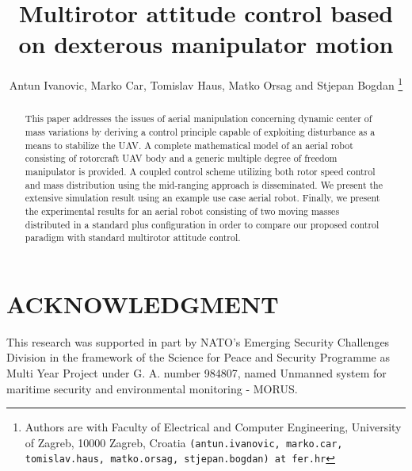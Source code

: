 \documentclass[letterpaper, 10 pt, conference]{ieeeconf}  %
\title{\LARGE \bf
Multirotor attitude control based on dexterous manipulator motion
}
\author{Antun Ivanovic, Marko Car, Tomislav Haus, Matko Orsag and Stjepan Bogdan
	\thanks{Authors are with Faculty of Electrical and Computer Engineering,
        University of Zagreb, 10000 Zagreb, Croatia
        {\tt\small (antun.ivanovic, marko.car, tomislav.haus, matko.orsag, stjepan.bogdan) at fer.hr}}}%
\begin{document}
\maketitle

\thispagestyle{empty}
\pagestyle{empty}


\begin{abstract}

This paper addresses the issues of aerial manipulation concerning dynamic center of mass variations by deriving a control principle capable of exploiting disturbance as a means to stabilize the UAV. A complete mathematical model of an aerial robot consisting of rotorcraft UAV body and a generic multiple degree of freedom manipulator is provided. A coupled control scheme utilizing both rotor speed control and mass distribution using the mid-ranging approach is disseminated. We present the extensive simulation result using an example use case aerial robot. Finally, we present the experimental results for an aerial robot consisting of two moving masses distributed in a standard plus configuration in order to compare our proposed control paradigm with standard multirotor attitude control.

\end{abstract}











\section*{ACKNOWLEDGMENT}

This research was supported in part by NATO's Emerging Security Challenges Division in the framework of the Science for Peace and Security Programme as Multi Year Project under G. A. number 984807, named Unmanned system for maritime security and environmental monitoring - MORUS.






\end{document}
